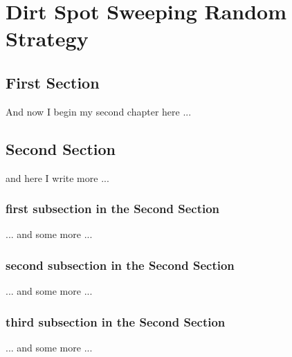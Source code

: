 \chapter{Dirt Spot Sweeping Random Strategy}
\ifpdf
    \graphicspath{{Dssr/DssrFigs/PNG/}{Dssr/DssrFigs/PDF/}{Dssr/DssrFigs/}}
\else
    \graphicspath{{Dssr/DssrFigs/EPS/}{Dssr/DssrFigs/}}
\fi

\section{First Section}
And now I begin my second chapter here ...

\section{Second Section}
and here I write more ...

\subsection{first subsection in the Second Section}
... and some more ...

\subsection{second subsection in the Second Section}
... and some more ...

\subsection{third subsection in the Second Section}
... and some more ...


